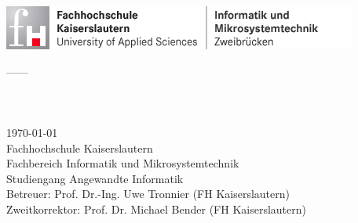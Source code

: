 
\begin{titlepage}
 	\includegraphics[scale=0.5]{fotos/fhlogo_imst.png}\\
	\begin{center}
		\rmfamily\Large 
		\small---\arbeitart ---\\
		\vspace{2\baselineskip}
		\rmfamily\huge\textbf{\bachelorarbeittitelDE}\\
		\vspace{1\baselineskip}
		\rmfamily\huge\textbf{\bachelorarbeittitelENG}\\		
		\vspace{2\baselineskip}
		\rmfamily\Large 
		\namedesauthors\\		
		\vspace{2\baselineskip}
		\rmfamily\large
		\today \\
		\vspace{2\baselineskip}
		\rmfamily\Large
		Fachhochschule Kaiserslautern\\
		Fachbereich Informatik und Mikrosystemtechnik\\
		Studiengang Angewandte Informatik\\
		\vspace{2\baselineskip}
		Betreuer: Prof. Dr.-Ing. Uwe Tronnier (FH Kaiserslautern)\\
		Zweitkorrektor: Prof. Dr.  Michael  Bender (FH Kaiserslautern)\\
	\end{center}
\end{titlepage} 
\cleardoublepage 
